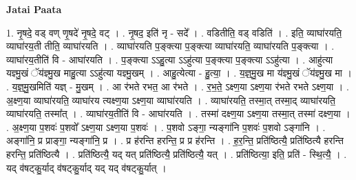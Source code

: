 \documentclass[17pt]{extarticle}
\begin{document}
\textbf{Jatai Paata} \newline

1. नृ॒षदे॒ वड् वण् णृ॒षदे॑ नृ॒षदे॒ वट् । . नृ॒षद॒ इति॑ नृ - सदे᳚ । . वडितीति॒ वड् वडिति॑ । . इति॒ व्याघा॑रयति॒ व्याघा॑रय॒ती तीति॒ व्याघा॑रयति । . व्याघा॑रयति प॒ङ्क्त्या प॒ङ्क्त्या व्याघा॑रयति॒ व्याघा॑रयति प॒ङ्क्त्या । . व्याघा॑रय॒तीति॑ वि - आघा॑रयति । . प॒ङ्क्त्या ऽऽहु॒त्या ऽऽहु॑त्या प॒ङ्क्त्या प॒ङ्क्त्या ऽऽहु॑त्या । . आहु॑त्या यज्ञ्मु॒खं ॅय॑ज्ञ्मु॒ख माहु॒त्या ऽऽहु॑त्या यज्ञ्मु॒खम् । . आहु॒त्येत्या - हु॒त्या॒ । . य॒ज्ञ्॒मु॒ख मा य॑ज्ञ्मु॒खं ॅय॑ज्ञ्मु॒ख मा । . य॒ज्ञ्॒मु॒खमिति॑ यज्ञ् - मु॒खम् । . आ र॑भते रभत॒ आ र॑भते । . र॒भ॒ते॒ ऽक्ष्ण॒या ऽक्ष्ण॒या र॑भते रभते ऽक्ष्ण॒या । . अ॒क्ष्ण॒या व्याघा॑रयति॒ व्याघा॑रय त्यक्ष्ण॒या ऽक्ष्ण॒या व्याघा॑रयति । . व्याघा॑रयति॒ तस्मा॒त् तस्मा॒द् व्याघा॑रयति॒ व्याघा॑रयति॒ तस्मा᳚त् । . व्याघा॑रय॒तीति॑ वि - आघा॑रयति । . तस्मा॑ दक्ष्ण॒या ऽक्ष्ण॒या तस्मा॒त् तस्मा॑ दक्ष्ण॒या । . अ॒क्ष्ण॒या प॒शवः॑ प॒शवो᳚ ऽक्ष्ण॒या ऽक्ष्ण॒या प॒शवः॑ । . प॒शवो ऽङ्गा॒ न्यङ्गा॑नि प॒शवः॑ प॒शवो ऽङ्गा॑नि । . अङ्गा॑नि॒ प्र प्राङ्गा॒ न्यङ्गा॑नि॒ प्र । . प्र ह॑रन्ति हरन्ति॒ प्र प्र ह॑रन्ति । . ह॒र॒न्ति॒ प्रति॑ष्ठित्यै॒ प्रति॑ष्ठित्यै हरन्ति हरन्ति॒ प्रति॑ष्ठित्यै । . प्रति॑ष्ठित्यै॒ यद् यत् प्रति॑ष्ठित्यै॒ प्रति॑ष्ठित्यै॒ यत् । . प्रति॑ष्ठित्या॒ इति॒ प्रति॑ - स्थि॒त्यै॒ । . यद् व॑षट्कु॒र्याद् व॑षट्कु॒र्याद् यद् यद् व॑षट्कु॒र्यात् । \newline
\end{document}

